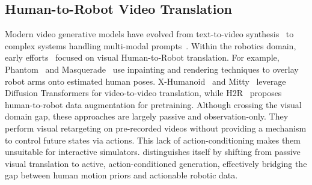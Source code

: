 \subsection{Human-to-Robot Video Translation}
Modern video generative models have evolved from text-to-video synthesis~\citep{kong2024hunyuanvideo,wang2025wan,yang2024cogvideox} to complex systems handling multi-modal prompts~\citep{bruce2024genie,jin2024pyramidal}. Within the robotics domain, early efforts~\citep{kling2024,runway2025} focused on visual Human-to-Robot translation.
For example, Phantom~\citep{lepert2503phantom} and Masquerade~\citep{lepert2025masquerade} use inpainting and rendering techniques to overlay robot arms onto estimated human poses. X-Humanoid~\citep{yang2025x} and Mitty~\citep{song2025mitty} leverage Diffusion Transformers for video-to-video translation, while H2R~\citep{li2025h2r} proposes human-to-robot data augmentation for pretraining. 
Although crossing the visual domain gap, these approaches are largely passive and observation-only. They perform visual retargeting on pre-recorded videos without providing a mechanism to control future states via actions. This lack of action-conditioning makes them unsuitable for interactive simulators. 
\our distinguishes itself by shifting from passive visual translation to active, action-conditioned generation, effectively bridging the gap between human motion priors and actionable robotic data.





